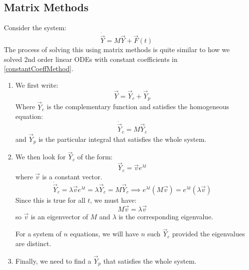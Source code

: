 \documentclass[../main.tex]{subfiles}
\begin{document}
\subsection{Matrix Methods}
Consider the system:
\[
  \dot{\vec{Y}} = M \vec{Y} + \vec{F}(t)
\]
The process of solving this using matrix methods is quite similar to how we solved 2nd order linear ODEs with constant coefficients in \cref{constantCoeffMethod}.
\begin{enumerate}
\item
  We first write:
  \[
    \vec{Y} = \vec{Y}_c + \vec{Y}_p
  \]
  Where $\vec{Y}_c$ is the complementary function and satisfies the homogeneous equation:
  \[
    \dot{\vec{Y}}_c = M\vec{Y}_c
  \]
  and $\vec{Y}_p$ is the particular integral that satisfies the whole system.
\item
  We then look for $\vec{Y}_c$ of the form:
  \[
    \vec{Y}_c = \vec{v}e^{\lambda t}
  \]
  where $\vec{v}$ is a constant vector.
  \[
    \dot{\vec{Y}}_c = \lambda \vec{v}e^{\lambda t} = \lambda \vec{Y}_c = M\vec{Y}_c \implies e^{\lambda t}(M\vec{v}) = e^{\lambda t}(\lambda \vec{v})
  \]
  Since this is true for all $t$, we must have:
  \[
    M \vec{v} = \lambda \vec{v}
  \]
  so $\vec{v}$ is an eigenvector of $M$ and $\lambda$ is the corresponding eigenvalue.

  For a system of $n$ equations, we will have $n$ such $\vec{Y}_c$ provided the eigenvalues are distinct.
\item Finally, we need to find a $\vec{Y}_p$ that satisfies the whole system.
\end{enumerate}
\end{document}
